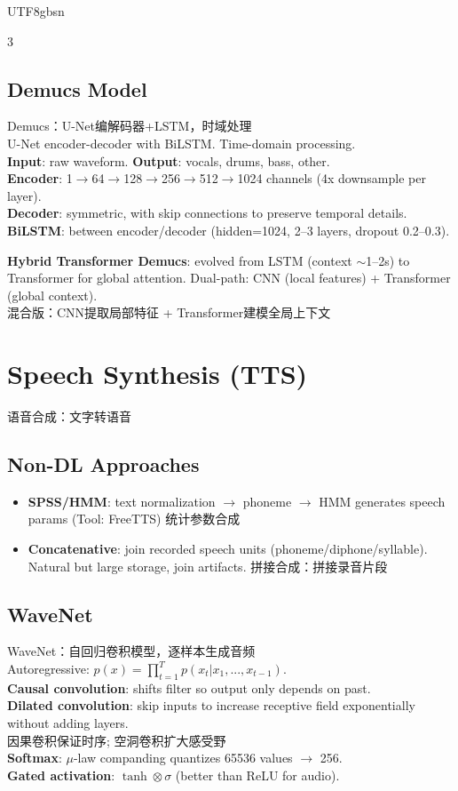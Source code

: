\documentclass[9pt,landscape,a4paper]{article}
\newcommand{\zhint}[1]{{\scriptsize\color{gray!70!black}#1}}
\begin{document}
\begin{CJK}{UTF8}{gbsn}
\begin{multicols}{3}
\subsection{Demucs Model}
\zhint{Demucs：U-Net编解码器+LSTM，时域处理}\\
U-Net encoder-decoder with BiLSTM. Time-domain processing.\\
\textbf{Input}: raw waveform. \textbf{Output}: vocals, drums, bass, other.\\
\textbf{Encoder}: 1$\to$64$\to$128$\to$256$\to$512$\to$1024 channels (4x downsample per layer).\\
\textbf{Decoder}: symmetric, with skip connections to preserve temporal details.\\
\textbf{BiLSTM}: between encoder/decoder (hidden=1024, 2--3 layers, dropout 0.2--0.3).

\textbf{Hybrid Transformer Demucs}: evolved from LSTM (context $\sim$1--2s) to Transformer for global attention. Dual-path: CNN (local features) + Transformer (global context).\\
\zhint{混合版：CNN提取局部特征 + Transformer建模全局上下文}

\section{Speech Synthesis (TTS)}
\zhint{语音合成：文字转语音}

\subsection{Non-DL Approaches}
\begin{itemize}[leftmargin=8pt,itemsep=0pt,topsep=0pt]
\item \textbf{SPSS/HMM}: text normalization $\to$ phoneme $\to$ HMM generates speech params (Tool: FreeTTS) \zhint{统计参数合成}
\item \textbf{Concatenative}: join recorded speech units (phoneme/diphone/syllable). Natural but large storage, join artifacts. \zhint{拼接合成：拼接录音片段}
\end{itemize}

\subsection{WaveNet}
\zhint{WaveNet：自回归卷积模型，逐样本生成音频}\\
Autoregressive: $p(x) = \prod_{t=1}^{T} p(x_t | x_1, ..., x_{t-1})$.\\
\textbf{Causal convolution}: shifts filter so output only depends on past.\\
\textbf{Dilated convolution}: skip inputs to increase receptive field exponentially without adding layers.\\
\zhint{因果卷积保证时序; 空洞卷积扩大感受野}\\
\textbf{Softmax}: $\mu$-law companding quantizes 65536 values $\to$ 256.\\
\textbf{Gated activation}: $\tanh \otimes \sigma$ (better than ReLU for audio).


\end{multicols}
\end{CJK}
\end{document}
